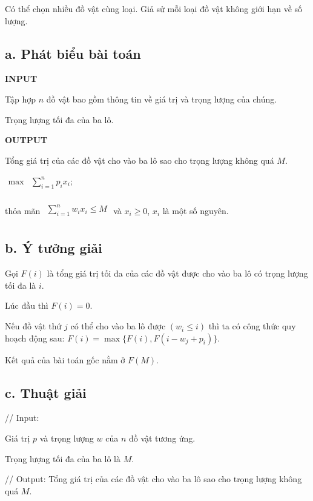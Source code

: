 \documentclass[12pt, a4paper, fleqn]{article}
\begin{document}
	Có thể chọn nhiều đồ vật cùng loại. Giả sử mỗi loại đồ vật không giới hạn về số lượng.
	
	\subsection*{a. Phát biểu bài toán}
	
	\textbf{INPUT}
	
	Tập hợp $n$ đồ vật bao gồm thông tin về giá trị và trọng lượng của chúng.
	
	Trọng lượng tối đa của ba lô.
	
	\textbf{OUTPUT}
	
	Tổng giá trị của các đồ vật cho vào ba lô sao cho trọng lượng không quá $M$.
	
	${\displaystyle
		{\begin{aligned}
			\max &\sum _{ i = 1}^{n}p_i x_i;\\
			\end{aligned}}}$
	
	thỏa mãn ${\displaystyle
		{\begin{aligned}
			\sum _{ i = 1}^{n}w_i x_i \leq M\\
			\end{aligned}}}$ và $x_i \geq 0$, $x_i$ là một số nguyên.
		
	\subsection*{b. Ý tưởng giải}
	
	Gọi $F(i)$ là tổng giá trị tối đa của các đồ vật được cho vào ba lô có trọng lượng tối đa là $i$.
	
	Lúc đầu thì $F(i) = 0$.
	
	Nếu đồ vật thứ $j$ có thể cho vào ba lô được $(w_i \leq i)$ thì ta có công thức quy hoạch động sau: $F(i) = \max\{F(i), F(i - w_j + p_i)\}$.
	
	Kết quả của bài toán gốc nằm ở $F(M)$.
	
	\subsection*{c. Thuật giải}
	
	// Input:
	
	Giá trị $p$ và trọng lượng $w$ của $n$ đồ vật tương ứng.
	
	Trọng lượng tối đa của ba lô là $M$.
	
	// Output: Tổng giá trị của các đồ vật cho vào ba lô sao cho trọng lượng không quá $M$.
	
\end{document}
